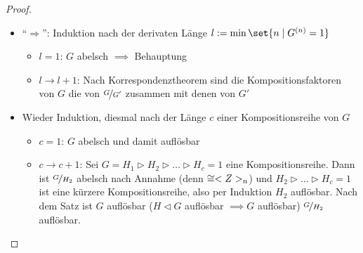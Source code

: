 \begin{proof}
	\begin{itemize}
		\item ``$\Rightarrow$'': Induktion nach der derivaten Länge $l := \min\set{n \mid G^{(n)} = 1}$
		\begin{itemize}
			\item $l=1$: $G$ abelsch $\implies$ Behauptung
			\item $l \to l+1$: Nach Korrespondenztheorem sind die Kompositionsfaktoren von $G$ die von $\lnkset{G}{G'}$ zusammen mit denen von $G'$
		\end{itemize}
		\item Wieder Induktion, diesmal nach der Länge $c$ einer Kompositionsreihe von $G$
		\begin{itemize}
			\item $c=1$: $G$ abelsch und damit auflösbar
			\item $c \to c+1$: Sei $G = H_1 \rhd H_2 \rhd \dots \rhd H_c =1$ eine Kompositionsreihe. Dann ist $\lnkset{G}{H_2}$ abelsch nach Annahme (denn $\cong <Z>_n$) und $H_2 \rhd \dots \rhd H_c =1$ ist eine kürzere Kompositionsreihe, also per Induktion $H_2$ auflösbar. Nach dem Satz ist $G$ auflösbar ($H \lhd G$ auflösbar $\implies G$ auflösbar) $\lnkset{G}{H_2}$ auflösbar.
		\end{itemize}
	\end{itemize}
\end{proof}